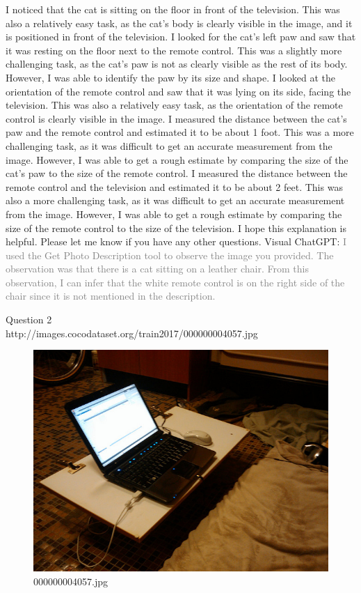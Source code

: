 \begin{enumerate}
{        I noticed that the cat is sitting on the floor in front of the television. This was also a relatively easy task, as the cat’s body is clearly visible in the image, and it is positioned in front of the television.
        I looked for the cat’s left paw and saw that it was resting on the floor next to the remote control. This was a slightly more challenging task, as the cat’s paw is not as clearly visible as the rest of its body. However, I was able to identify the paw by its size and shape.
        I looked at the orientation of the remote control and saw that it was lying on its side, facing the television. This was also a relatively easy task, as the orientation of the remote control is clearly visible in the image.
        I measured the distance between the cat’s paw and the remote control and estimated it to be about 1 foot. This was a more challenging task, as it was difficult to get an accurate measurement from the image. However, I was able to get a rough estimate by comparing the size of the cat’s paw to the size of the remote control.
        I measured the distance between the remote control and the television and estimated it to be about 2 feet. This was also a more challenging task, as it was difficult to get an accurate measurement from the image. However, I was able to get a rough estimate by comparing the size of the remote control to the size of the television.
        I hope this explanation is helpful. Please let me know if you have any other questions.}
        \subitem Visual ChatGPT: \textcolor{gray}{I used the Get Photo Description tool to observe the image you provided. The observation was that there is a cat sitting on a leather chair. From this observation, I can infer that the white remote control is on the right side of the chair since it is not mentioned in the description.}
    \end{enumerate}
Question 2\\
http://images.cocodataset.org/train2017/000000004057.jpg
    \begin{figure}[h]
        \centering
        \includegraphics[width=0.8\linewidth]{../image set/easy/000000004057.jpg}
        \caption{000000004057.jpg}
    \end{figure}
